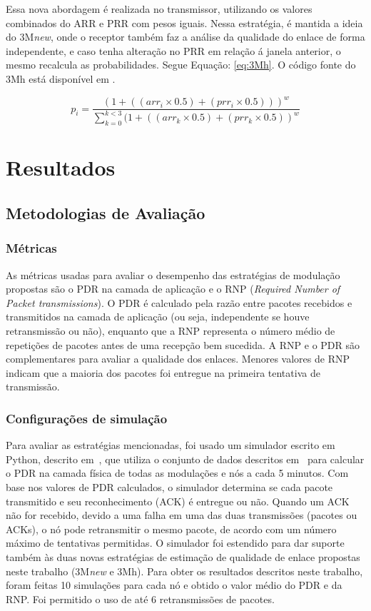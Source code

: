 Essa nova abordagem é realizada no transmissor, utilizando os valores combinados do ARR e PRR com pesos iguais. Nessa estratégia, é mantida a ideia do 3M\textit{new}, onde o receptor também faz a análise da qualidade do enlace de forma independente, e caso tenha alteração no PRR em relação á janela anterior, o mesmo recalcula as probabilidades. Segue Equação: \ref{eq:3Mh}. O código fonte do 3Mh está disponível em \cite{GitDiego}. 

\begin{equation}
\label{eq:3Mh}
	p_i = \frac{{(1+((arr_i\times0.5) + (prr_i\times0.5)))}^w}{\sum_{k=0}^{k<3}{(1+((arr_k\times0.5) + (prr_k\times0.5))}^w}
\end{equation}

\chapter{Resultados}

\section{Metodologias de Avaliação}
\label{res:parâmestros}

\subsection{Métricas}

As métricas usadas para avaliar o desempenho das estratégias de modulação propostas são o PDR na camada de aplicação e o RNP (\textit{Required Number of Packet transmissions}). O PDR é calculado pela razão entre pacotes recebidos e transmitidos na camada de aplicação (ou seja, independente se houve retransmissão ou não), enquanto que a RNP representa o número médio de repetições de pacotes antes de uma recepção bem sucedida. A RNP e o PDR são complementares para avaliar a qualidade dos enlaces. Menores valores de RNP indicam que a maioria dos pacotes foi entregue na primeira tentativa de transmissão.

\subsection{Configurações de simulação}

Para avaliar as estratégias mencionadas, foi usado um simulador escrito em Python, descrito em~\cite{gomes2020improving}, que utiliza o conjunto de dados descritos em~\cite{tuset2020evaluating} para calcular o PDR na camada física de todas as modulações e nós a cada 5 minutos. Com base nos valores de PDR calculados, o simulador determina se cada pacote transmitido e seu reconhecimento (ACK) é entregue ou não. Quando um ACK não for recebido, devido a uma falha em uma das duas transmissões (pacotes ou ACKs), o nó pode retransmitir o mesmo pacote, de acordo com um número máximo de tentativas permitidas. O simulador foi estendido para dar suporte também às duas novas estratégias de estimação de qualidade de enlace propostas neste trabalho (3M\textit{new} e 3Mh). Para obter os resultados descritos neste trabalho, foram feitas 10 simulações para cada nó e obtido o valor médio do PDR e da RNP. Foi permitido o uso de até 6 retransmissões de pacotes.  

